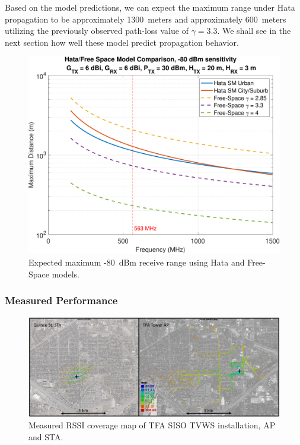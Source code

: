 	Based on the model predictions, we can expect the maximum range under Hata propagation to be approximately 1300~meters and approximately 600~meters utilizing the previously observed path-loss value of $\gamma = 3.3$.
	We shall see in the next section how well these model predict propagation behavior.
		
		
\begin{figure}[ht!]
\centering
  	\includegraphics[width=0.8\linewidth]{figs/wardrive/Hata_v_FreeSpace_11_02_2018}   
   	\caption{Expected maximum -80~dBm receive range using Hata and Free-Space models.
	\label{fig_hata_model}}
\end{figure}

\subsubsection{Measured Performance}
\label{sec_tfa_wardrive_performance}
	
\begin{figure}[ht]
\centering
  	\includegraphics[width=1\linewidth]{figs/wardrive/TFA_wardrive_coverage}   
   	\caption{Measured RSSI coverage map of TFA \ac{SISO} \ac{TVWS} installation, \ac{AP} and \ac{STA}.
	\label{fig_uhf_rssi_map}}
\end{figure}

